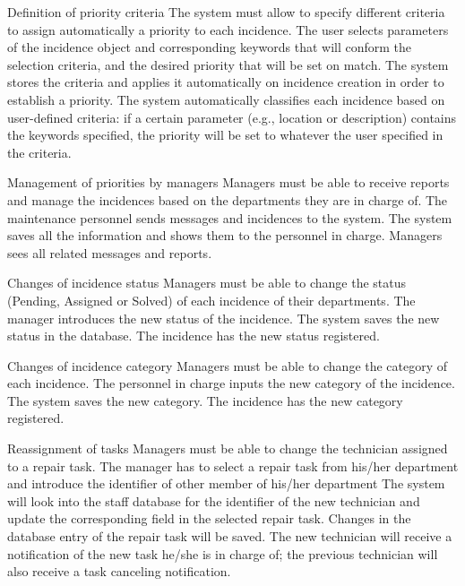 \begin{requirement}{Definition of priority criteria}
\reqdesc The system must allow to specify different criteria to assign automatically a priority to each incidence.
\reqin The user selects parameters of the incidence object and corresponding keywords that will conform the selection criteria, and the desired priority that will be set on match.
\reqsteps The system stores the criteria and applies it automatically on incidence creation in order to establish a priority.
\reqout The system automatically classifies each incidence based on user-defined criteria: if a certain parameter (e.g., location or description) contains the keywords specified, the priority will be set to whatever the user specified in the criteria.
\end{requirement}

\begin{requirement}{Management of priorities by managers}
\reqdesc Managers must be able to receive reports and manage the incidences based on the departments they are in charge of.
\reqin The maintenance personnel sends messages and incidences to the system.
\reqsteps The system saves all the information and shows them to the personnel in charge.
\reqout Managers sees all related messages and reports.
\end{requirement}

\begin{requirement}{Changes of incidence status}
\reqdesc Managers must be able to change the status (Pending, Assigned or Solved) of each incidence of their departments.
\reqin The manager introduces the new status of the incidence.
\reqsteps The system saves the new status in the database.
\reqout The incidence has the new status registered.
\end{requirement}

\begin{requirement}{Changes of incidence category}
\reqdesc Managers must be able to change the category of each incidence.
\reqin The personnel in charge inputs the new category of the incidence.
\reqsteps The system saves the new category.
\reqout The incidence has the new category registered.
\end{requirement}

\begin{requirement}{Reassignment of tasks}
\reqdesc Managers must be able to change the technician assigned to a repair task.
\reqin The manager has to select a repair task from his/her department and introduce the identifier of other member of his/her department
\reqsteps The system will look into the staff database for the identifier of the new technician and update the corresponding field in the selected repair task.
\reqout Changes in the database entry of the repair task will be saved. The new technician will receive a notification of the new task he/she is in charge of; the previous technician will also receive a task canceling notification.
\end{requirement}

